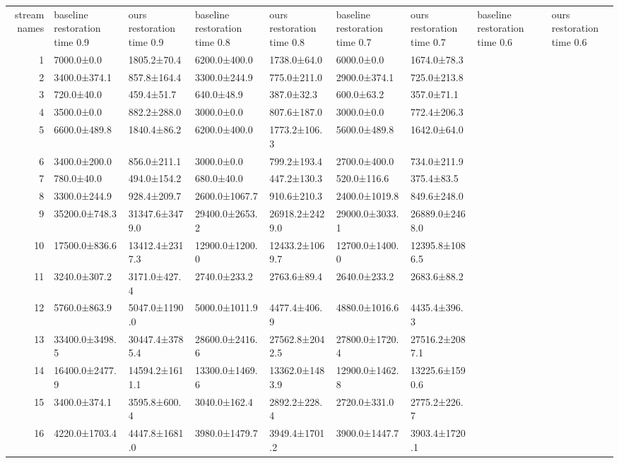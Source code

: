 \begin{tabular}{|r|l|l|l|l|l|l|l|l|}
  \hline
  stream names & baseline restoration time 0.9 & ours restoration time 0.9 & baseline restoration time 0.8 & ours restoration time 0.8 & baseline restoration time 0.7 & ours restoration time 0.7 & baseline restoration time 0.6 & ours restoration time 0.6 \\ 
  1 & 7000.0±0.0 & 1805.2±70.4 & 6200.0±400.0 & 1738.0±64.0 & 6000.0±0.0 & 1674.0±78.3 \\ 
  2 & 3400.0±374.1 & 857.8±164.4 & 3300.0±244.9 & 775.0±211.0 & 2900.0±374.1 & 725.0±213.8 \\ 
  3 & 720.0±40.0 & 459.4±51.7 & 640.0±48.9 & 387.0±32.3 & 600.0±63.2 & 357.0±71.1 \\ 
  4 & 3500.0±0.0 & 882.2±288.0 & 3000.0±0.0 & 807.6±187.0 & 3000.0±0.0 & 772.4±206.3 \\ 
  5 & 6600.0±489.8 & 1840.4±86.2 & 6200.0±400.0 & 1773.2±106.3 & 5600.0±489.8 & 1642.0±64.0 \\ 
  6 & 3400.0±200.0 & 856.0±211.1 & 3000.0±0.0 & 799.2±193.4 & 2700.0±400.0 & 734.0±211.9 \\ 
  7 & 780.0±40.0 & 494.0±154.2 & 680.0±40.0 & 447.2±130.3 & 520.0±116.6 & 375.4±83.5 \\ 
  8 & 3300.0±244.9 & 928.4±209.7 & 2600.0±1067.7 & 910.6±210.3 & 2400.0±1019.8 & 849.6±248.0 \\ 
  9 & 35200.0±748.3 & 31347.6±3479.0 & 29400.0±2653.2 & 26918.2±2429.0 & 29000.0±3033.1 & 26889.0±2468.0 \\ 
  10 & 17500.0±836.6 & 13412.4±2317.3 & 12900.0±1200.0 & 12433.2±1069.7 & 12700.0±1400.0 & 12395.8±1086.5 \\ 
  11 & 3240.0±307.2 & 3171.0±427.4 & 2740.0±233.2 & 2763.6±89.4 & 2640.0±233.2 & 2683.6±88.2 \\ 
  12 & 5760.0±863.9 & 5047.0±1190.0 & 5000.0±1011.9 & 4477.4±406.9 & 4880.0±1016.6 & 4435.4±396.3 \\ 
  13 & 33400.0±3498.5 & 30447.4±3785.4 & 28600.0±2416.6 & 27562.8±2042.5 & 27800.0±1720.4 & 27516.2±2087.1 \\ 
  14 & 16400.0±2477.9 & 14594.2±1611.1 & 13300.0±1469.6 & 13362.0±1483.9 & 12900.0±1462.8 & 13225.6±1590.6 \\ 
  15 & 3400.0±374.1 & 3595.8±600.4 & 3040.0±162.4 & 2892.2±228.4 & 2720.0±331.0 & 2775.2±226.7 \\ 
  16 & 4220.0±1703.4 & 4447.8±1681.0 & 3980.0±1479.7 & 3949.4±1701.2 & 3900.0±1447.7 & 3903.4±1720.1 \\ 

\end{tabular}
